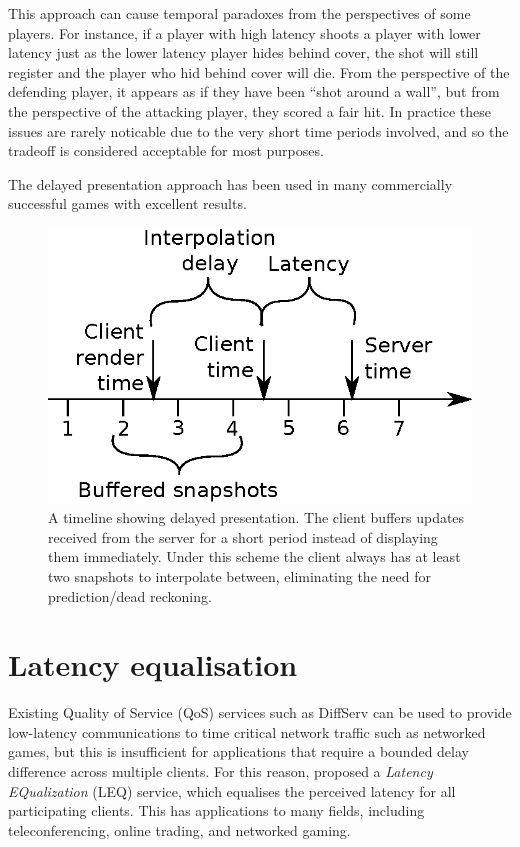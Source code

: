 \documentclass[conference]{IEEEtran}
\begin{document}
	This approach can cause temporal paradoxes from the perspectives of some players. For instance, if a player with high latency shoots a player with lower latency just as the lower latency player hides behind cover, the shot will still register and the player who hid behind cover will die. From the perspective of the defending player, it appears as if they have been ``shot around a wall'', but from the perspective of the attacking player, they scored a fair hit. In practice these issues are rarely noticable due to the very short time periods involved, and so the tradeoff is considered acceptable for most purposes.

	The delayed presentation approach has been used in many commercially successful games with excellent results.

	\begin{figure}
		\centering\includegraphics[width=\linewidth]{figures/interpolation_timeline.eps}
		\caption{A timeline showing delayed presentation. The client buffers updates received from the server for a short period instead of displaying them immediately. Under this scheme the client always has at least two snapshots to interpolate between, eliminating the need for prediction/dead reckoning.}
		\label{fig:interpolation_timeline}
	\end{figure}

	\section{Latency equalisation}

	Existing Quality of Service (QoS) services such as DiffServ can be used to provide low-latency communications to time critical network traffic such as networked games, but this is insufficient for applications that require a bounded delay difference across multiple clients. For this reason, \textcite{yu2012latency} proposed a \emph{Latency EQualization} (LEQ) service, which equalises the perceived latency for all participating clients. This has applications to many fields, including teleconferencing, online trading, and networked gaming.
\end{document}
